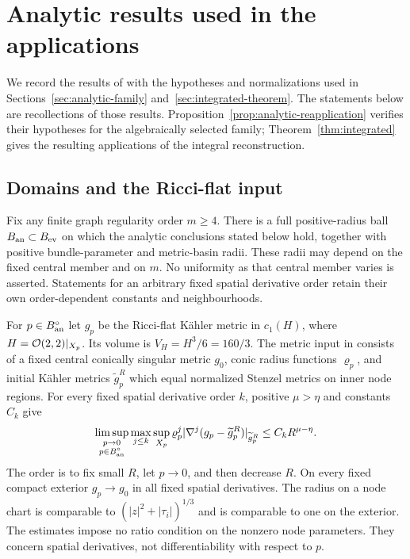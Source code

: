 \section{Analytic results used in the applications}
\label{app:analytic-inputs}

We record the results of \cite{W_Hodge,W_HYM} with the
hypotheses and normalizations used in Sections~\ref{sec:analytic-family}
and~\ref{sec:integrated-theorem}. The statements below are
recollections of those results. Proposition~\ref{prop:analytic-reapplication}
verifies their hypotheses for the algebraically selected family;
Theorem~\ref{thm:integrated} gives the resulting applications
of the integral reconstruction.

\subsection{Domains and the Ricci-flat input}

Fix any finite graph regularity order $m\ge4$. There is a full
positive-radius ball $B_{\rm an}\subset B_{\rm ev}$ on which the
analytic conclusions stated below hold, together with positive
bundle-parameter and metric-basin radii. These radii may depend
on the fixed central member and on $m$. No uniformity as that
central member varies is asserted. Statements for an arbitrary
fixed spatial derivative order retain their own order-dependent
constants and neighbourhoods.

For $p\in B_{\rm an}^{\circ}$ let $g_p$ be the Ricci-flat
K\"ahler metric in $c_1(H)$, where $H=\mathcal O(2,2)|_{X_p}$.
Its volume is $V_H=H^3/6=160/3$. The metric input in
\cite[Sections~7--10]{W_Hodge} consists of a fixed central
conically singular metric $g_0$, conic radius functions
$\varrho_p$, and initial K\"ahler metrics $\widetilde g_p^R$
which equal normalized Stenzel metrics on inner node regions.
For every fixed spatial derivative order $k$, positive
$\mu>\eta$ and constants $C_k$ give
\begin{equation}\label{eq:actual-metric-input}
 \limsup_{\substack{p\to0\\p\in B_{\rm an}^{\circ}}}
 \max_{j\le k}\sup_{X_p}\varrho_p^j
 |\nabla^j(g_p-\widetilde g_p^R)|_{\widetilde g_p^R}
                         \le C_k R^{\mu-\eta}.
\end{equation}
The order is to fix small $R$, let $p\to0$, and then decrease
$R$. On every fixed compact exterior $g_p\to g_0$ in all
fixed spatial derivatives. The radius on a node chart is
comparable to $(|z|^2+|\tau_i|)^{1/3}$ and is comparable to
one on the exterior. The estimates impose no ratio condition
on the nonzero node parameters. They concern spatial derivatives,
not differentiability with respect to $p$.

